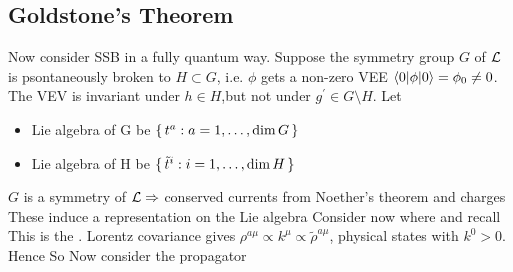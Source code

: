 \documentclass{article}
\begin{document}
\subsection{Goldstone's Theorem}
Now consider SSB in a fully quantum way. Suppose the symmetry group $G$ of $\mathcal{L}$ is psontaneously broken to $H\subset G$, i.e. $\phi$ gets a non-zero VEE $\braket{0| \phi | 0} = \phi_0 \neq 0$. The VEV is invariant under $h\in H$,but not under $g^\prime \in G\setminus H$. Let 
\begin{itemize}
    \item Lie algebra of G be $\set{t^a : a=1,\dots,\dim G}$
    \item Lie algebra of H be $\set{\tilde{t}^i : i=1,\dots,\dim H}$
\end{itemize}
$G$ is a symmetry of $\mathcal{L} \Rightarrow $ conserved currents from Noether's theorem 
and charges 
These induce a representation on the Lie algebra 
Consider now 
where 
and recall 
This is the . Lorentz covariance gives $\rho^{a\mu} \propto k^\mu \propto \tilde{\rho}^{a\mu}$, physical states with $k^0 > 0$. Hence 
So 
Now consider the propagator 
\end{document}
